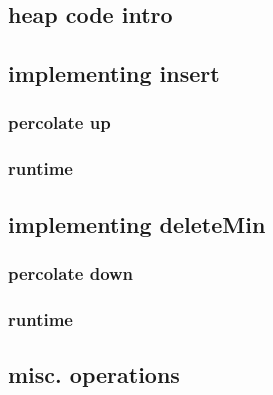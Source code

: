 \subsection{heap code intro}



\subsection{implementing insert}



\subsubsection{percolate up}




\subsubsection{runtime}





\subsection{implementing deleteMin}



\subsubsection{percolate down}




\subsubsection{runtime}



%

\subsection{misc. operations}



